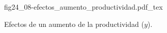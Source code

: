 \begin{figure}[h]
\centering
\def\svgwidth{0.5\textwidth}
{fig24_08-efectos_aumento_productividad.pdf_tex}
\caption{Efectos de un aumento de la productividad ($y$).}
\label{fig24_08-efectos_aumento_productividad}
\end{figure}